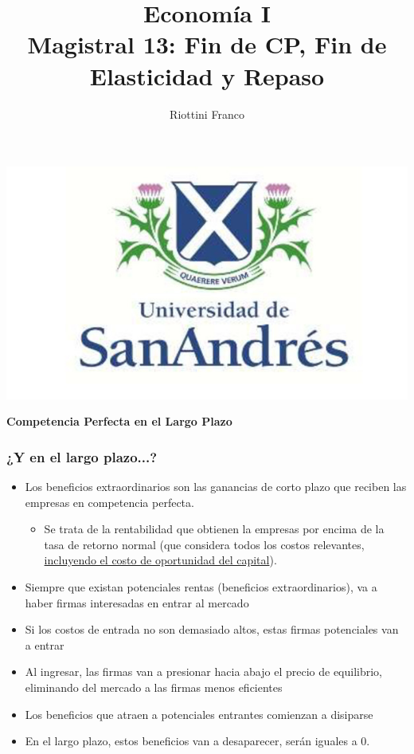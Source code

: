 \documentclass{beamer}
\title[Economía I]{Economía I \vspace{4mm}
\\ Magistral 13: Fin de CP, Fin de Elasticidad y Repaso}
\date{}
\author[Franco Riottini]{Riottini Franco}
\institute[]{Universidad de San Andrés}
\begin{document}
\begin{frame}
    \titlepage
    \centering
    \includegraphics[scale=0.2]{../Figures/logoUDESA.jpg} 
\end{frame}

\begin{frame}
    \centering
    \begin{boxB}
    \centering \Large \textbf{Competencia Perfecta en el Largo Plazo} \\   
    \end{boxB}
\end{frame}

\begin{frame}
\frametitle{¿Y en el largo plazo...?}
\begin{itemize}
\item Los beneficios extraordinarios son las ganancias de corto plazo que reciben las empresas en competencia perfecta.
    \begin{itemize}
    \item Se trata de la rentabilidad que obtienen la empresas por encima de la tasa de retorno normal (que considera todos los costos relevantes, \underline{incluyendo el costo de oportunidad del capital}).
    \end{itemize}
    \item Siempre que existan potenciales rentas (beneficios extraordinarios), va a haber firmas interesadas en entrar al mercado
    \item Si los costos de entrada no son demasiado altos, estas firmas potenciales van a entrar
    \item Al ingresar, las firmas van a presionar hacia abajo el precio de equilibrio, eliminando del mercado a las firmas menos eficientes
    \item Los beneficios que atraen a potenciales entrantes comienzan a disiparse
    \item En el largo plazo, estos beneficios van a desaparecer, serán iguales a 0.
    \end{itemize}
\end{frame}
\end{document}
